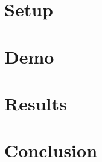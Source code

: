 \documentclass[a4paper]{article}
\begin{document}
\clearpage
\section{Setup}



\clearpage
\section{Demo}
\label{sec::demo}



\clearpage
\section{Results}



\clearpage
\section{Conclusion}



\end{document}

